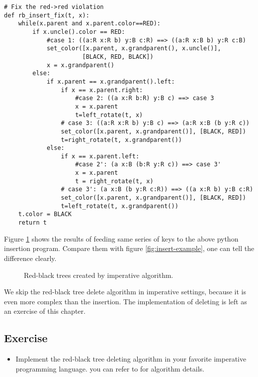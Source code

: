 \documentclass{article}
\begin{document}
\begin{lstlisting}
# Fix the red->red violation
def rb_insert_fix(t, x):
    while(x.parent and x.parent.color==RED):
        if x.uncle().color == RED:
            #case 1: ((a:R x:R b) y:B c:R) ==> ((a:R x:B b) y:R c:B)
            set_color([x.parent, x.grandparent(), x.uncle()],
                      [BLACK, RED, BLACK])
            x = x.grandparent()
        else:
            if x.parent == x.grandparent().left:
                if x == x.parent.right:
                    #case 2: ((a x:R b:R) y:B c) ==> case 3
                    x = x.parent
                    t=left_rotate(t, x)
                # case 3: ((a:R x:R b) y:B c) ==> (a:R x:B (b y:R c))
                set_color([x.parent, x.grandparent()], [BLACK, RED])
                t=right_rotate(t, x.grandparent())
            else:
                if x == x.parent.left:
                    #case 2': (a x:B (b:R y:R c)) ==> case 3'
                    x = x.parent
                    t = right_rotate(t, x)
                # case 3': (a x:B (b y:R c:R)) ==> ((a x:R b) y:B c:R)
                set_color([x.parent, x.grandparent()], [BLACK, RED])
                t=left_rotate(t, x.grandparent())
    t.color = BLACK
    return t
\end{lstlisting}

Figure \ref{fig:imperative-insert} shows the results of feeding same
series of keys to the above python insertion program. Compare them with
figure \ref{fig:insert-example}, one can tell the difference clearly.

\begin{figure}[htbp]
   \centering
   \caption{Red-black trees created by imperative algorithm.} 
   \label{fig:imperative-insert}
\end{figure}

We skip the red-black tree delete algorithm in imperative settings, because it
is even more complex than the insertion. The implementation of deleting is
left as an exercise of this chapter.

\subsection*{Exercise}
\begin{itemize}
\item Implement the red-black tree deleting algorithm in your favorite
imperative programming language. you can refer to \cite{CLRS} for algorithm
details.
\end{itemize}
\end{document}
